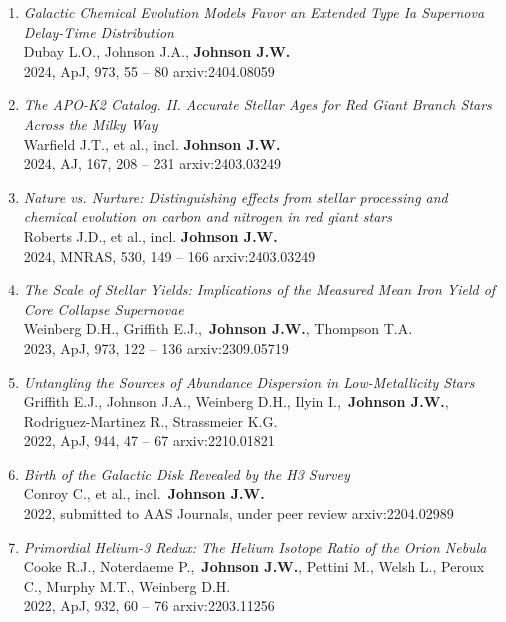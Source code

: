 \documentclass[cv.tex]{subfiles}
\begin{document}
\begin{enumerate}
	\item \textit{Galactic Chemical Evolution Models Favor an Extended Type Ia
	Supernova Delay-Time Distribution}
	\\
	Dubay L.O., Johnson J.A., \textbf{Johnson J.W.}
	\\
	2024, ApJ, 973, 55 -- 80 \hfill arxiv:2404.08059

	\item \textit{The APO-K2 Catalog. II. Accurate Stellar Ages for Red Giant
	Branch Stars Across the Milky Way}
	\\
	Warfield J.T., et al., incl. \textbf{Johnson J.W.}
	\\
	2024, AJ, 167, 208 -- 231 \hfill arxiv:2403.03249

	\item \textit{Nature vs. Nurture: Distinguishing effects from stellar
	processing and chemical evolution on carbon and nitrogen in red giant stars}
	\\
	Roberts J.D., et al., incl. \textbf{Johnson J.W.}
	\\
	2024, MNRAS, 530, 149 -- 166 \hfill arxiv:2403.03249

	\item \textit{The Scale of Stellar Yields: Implications of the Measured
	Mean Iron Yield of Core Collapse Supernovae}
	\\
	Weinberg D.H., Griffith E.J.,~\textbf{Johnson J.W.}, Thompson T.A.
	\\
	2023, ApJ, 973, 122 -- 136 \hfill arxiv:2309.05719

	\item \textit{Untangling the Sources of Abundance Dispersion in
	Low-Metallicity Stars}
	\\
	Griffith E.J., Johnson J.A., Weinberg D.H., Ilyin I.,~\textbf{Johnson J.W.},
	Rodriguez-Martinez R., Strassmeier K.G.
	\\
	2022, ApJ, 944, 47 -- 67 \hfill arxiv:2210.01821

	\item \textit{Birth of the Galactic Disk Revealed by the H3 Survey}
	\\
	Conroy C., et al., incl.~\textbf{Johnson J.W.}
	\\
	2022, submitted to AAS Journals, under peer review \hfill arxiv:2204.02989

	\item \textit{Primordial Helium-3 Redux: The Helium Isotope Ratio of the
	Orion Nebula}
	\\
	Cooke R.J., Noterdaeme P.,~\textbf{Johnson J.W.}, Pettini M., Welsh L.,
	Peroux C., Murphy M.T., Weinberg D.H.
	\\
	2022, ApJ, 932, 60 -- 76 \hfill arxiv:2203.11256


\end{enumerate}
\end{document}
